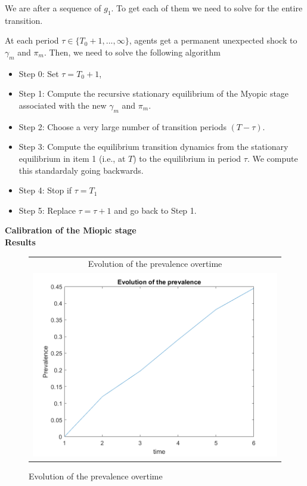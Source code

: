 We are after a sequence of $g_1$. To get each of them we need to solve for the entire transition.

At each period $\tau \in \{T_0+1,..., \infty\}$, agents get a permanent unexpected shock to $\gamma_m$ and $\pi_m$. Then, we need to solve the following algorithm %

\begin{itemize}
\item Step 0: Set $\tau=T_0+1$,
\item Step 1: Compute the recursive stationary equilibrium of the Myopic stage associated with the new $\gamma_m$ and $\pi_m$. 
\item Step 2: Choose a very large number of transition  periods $(T-\tau)$.
\item Step 3: Compute the equilibrium transition dynamics from the stationary equilibrium in item 1 (i.e., at $T$) to the  equilibrium in period $\tau$. We compute this standardaly going backwards.
\item Step 4: Stop if $\tau=T_1$
\item Step 5: Replace $\tau=\tau+1$ and go back to Step 1.
\end{itemize}




\textbf{Calibration of  the Miopic stage}\\

\textbf{Results}\\

\begin{figure}[H]
\caption{Evolution of the prevalence overtime}
\hspace{-2.0cm}
\begin{center}
\begin{tabular}{c}
\multicolumn{1}{c}{Evolution of the prevalence overtime} \\  
\includegraphics[angle=0,width=.5\textwidth]{figures/PREV.png}   
\end{tabular}
\end{center}
\label{fig:6}
\end{figure}
\newpage

